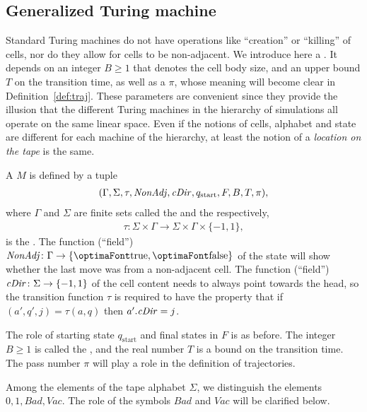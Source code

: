 \documentclass[12pt]{memoir}
\renewcommand{\ge}{\geq}
\newcommand{\fld}[1]{\ensuremath{\textit{#1\/}}}
\def\B{B}
\newcommand{\Bad}{\mathit{Bad}}
\newcommand{\Vacant}{\mathit{Vac}}
\newcommand{\Tu}{T}
\newcommand{\cDir}{\fld{cDir}}
\newcommand{\NonAdj}{\fld{NonAdj}}
\newcommand{\start}{\mathrm{start}}
\begin{document}
\subsection{Generalized Turing machine}

Standard Turing machines do not have
operations like ``creation'' or ``killing'' of cells, nor
do they allow for cells to be non-adjacent.
We introduce here a .
It depends on an integer \( \B \ge 1 \) that denotes the cell body size,
and an upper bound \( \Tu \) on the transition time, as well as a  \( \pi \),
whose meaning will become clear in Definition~\ref{def:traj}.
These parameters are convenient since they provide the illusion that the different Turing
machines in the hierarchy of simulations all operate on the same linear space.
Even if the notions of cells, alphabet
and state are different for each machine of the hierarchy, 
at least the notion of a \emph{location on the tape} is the same.


\begin{definition}\label{def:gen-TM}
    A  \( M \) is defined by a tuple
        \begin{align}\label{eq:gen-TM}
             (\Gamma, \Sigma, \tau, \NonAdj, \cDir, q_{\start},F, \B, \Tu, \pi),
       \end{align}
    where \( \Gamma \) and \( \Sigma \) are finite sets
    called the  and the  respectively,
        \begin{align*}
             \tau: \Sigma\times \Gamma
             \to \Sigma\times \Gamma\times\{-1,1\},
        \end{align*}
    is the .
The function (``field'') \( \NonAdj\colon\Gamma\to\{\true,\false\} \) of the 
state will show whether the last move was from a non-adjacent cell.
The function (``field'') \( \cDir\colon\Sigma\to\{-1,1\} \) of the cell content
needs to always point towards the head, so 
the transition function \( \tau \) is required to have the property that
if \( (a',q',j)=\tau(a,q) \) then \( a'.\cDir=j \).

The role of starting state \( q_{\start} \) and final states in \( F \) is as before.
The integer \( \B\ge 1 \) is called the ,
and the real number \( \Tu \) is a bound on the transition time.
The pass number \( \pi \) will play a role in the definition of trajectories.

Among the elements of the tape alphabet \( \Sigma \), 
we distinguish the elements \( 0,1,\Bad,\Vacant \).
The role of the symbols \( \Bad \) and \( \Vacant \) will be clarified below.
\end{definition}
\end{document}
